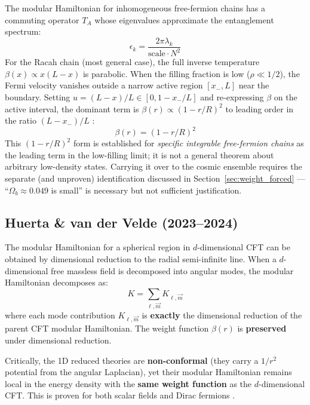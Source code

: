 \documentclass[11pt,letterpaper]{article}
\begin{document}
The modular Hamiltonian for inhomogeneous free-fermion chains has a commuting
operator $T_A$ whose eigenvalues approximate the entanglement spectrum:
\begin{equation}
  \epsilon_k = \frac{2\pi \lambda_k}{\mathrm{scale} \cdot N^2}
  \label{eq:bernard_eigen}
\end{equation}
For the Racah chain (most general case), the full inverse temperature
$\beta(x) \propto x(L-x)$ is parabolic. When the filling fraction is low
($\rho \ll 1/2$), the Fermi velocity vanishes outside a narrow active region
$[x_-, L]$ near the boundary. Setting $u = (L-x)/L \in [0, 1-x_-/L]$ and
re-expressing $\beta$ on the active interval, the dominant term is
$\beta(r) \propto (1-r/R)^2$ to leading order in the ratio $(L-x_-)/L$
\citep{bernard2024}:
\begin{equation}
  \beta(r) = (1 - r/R)^2
  \label{eq:racah_weight}
\end{equation}
This $(1-r/R)^2$ form is established for \emph{specific integrable
free-fermion chains} as the leading term in the low-filling limit; it is not a
general theorem about arbitrary low-density states. Carrying it over to the
cosmic ensemble requires the separate (and unproven) identification discussed in
Section~\ref{sec:weight_forced} --- ``$\Omega_b \approx 0.049$ is small'' is
necessary but not sufficient justification.

\subsection{Huerta \& van der Velde (2023--2024)}

The modular Hamiltonian for a spherical region in $d$-dimensional CFT can be
obtained by dimensional reduction to the radial semi-infinite line. When a
$d$-dimensional free massless field is decomposed into angular modes, the
modular Hamiltonian decomposes as:
\begin{equation}
  K = \sum_{\ell, \vec{m}} K_{\ell, \vec{m}}
  \label{eq:huerta_decomp}
\end{equation}
where each mode contribution $K_{\ell, \vec{m}}$ is \textbf{exactly} the dimensional
reduction of the parent CFT modular Hamiltonian. The weight function $\beta(r)$
is \textbf{preserved} under dimensional reduction.

Critically, the 1D reduced theories are \textbf{non-conformal} (they carry a
$1/r^2$ potential from the angular Laplacian), yet their modular Hamiltonian
remains local in the energy density with the \textbf{same weight function} as the
$d$-dimensional CFT. This is proven for both scalar fields and Dirac fermions
\citep{huerta2023a, huerta2023b}.
\end{document}
